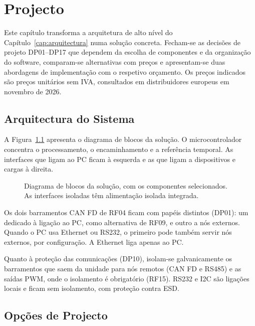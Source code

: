 \chapter{Projecto}
\label{cap:projecto}

Este capítulo transforma a arquitetura de alto nível do
Capítulo~\ref{cap:arquitectura} numa solução concreta. Fecham-se as
decisões de projeto DP01--DP17 que dependem da escolha de componentes e da
organização do software, comparam-se alternativas com preços e
apresentam-se duas abordagens de implementação com o respetivo orçamento.
Os preços indicados são preços unitários sem IVA, consultados em
distribuidores europeus em novembro de 2026.

\section{Arquitectura do Sistema}
\label{sec:proj-arquitetura}

A Figura~\ref{fig:blocos-projeto} apresenta o diagrama de blocos da
solução. O microcontrolador concentra o processamento, o encaminhamento e
a referência temporal. As interfaces que ligam ao PC ficam à esquerda e
as que ligam a dispositivos e cargas à direita.

\begin{figure}[htbp]
\centering
{}
\caption[Diagrama de blocos da solução.]{Diagrama de blocos da solução, com os componentes selecionados. As interfaces isoladas têm alimentação isolada integrada.}
\label{fig:blocos-projeto}
\end{figure}

Os dois barramentos CAN FD de RF04 ficam com papéis distintos (DP01): um
dedicado à ligação ao PC, como alternativa de RF09, e outro a nós
externos. Quando o PC usa Ethernet ou RS232, o primeiro pode também
servir nós externos, por configuração. A Ethernet liga apenas ao PC.

Quanto à proteção das comunicações (DP10), isolam-se galvanicamente os
barramentos que saem da unidade para nós remotos (CAN FD e RS485) e as
saídas PWM, onde o isolamento é obrigatório (RF15). RS232 e I2C são
ligações locais e ficam sem isolamento, com proteção contra ESD.

\section{Opções de Projecto}
\label{sec:proj-opcoes}

